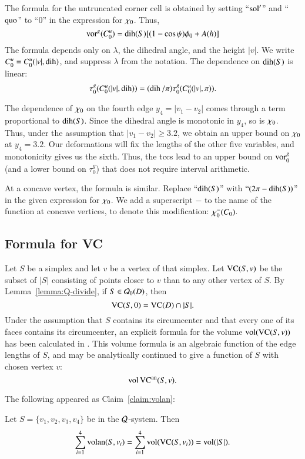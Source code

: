 The formula for the untruncated corner cell is obtained by setting
``$\operatorname{sol}'$'' and ``$\operatorname{quo}$'' to ``$0$'' in the expression for
$\chi_0$. Thus,
    $$
    \operatorname{vor}^g(C_0^u) = \operatorname{dih}(S)[(1-\cos\psi)\phi_0 + A(h)]
    $$
The formula depends only on $\lambda$, the dihedral angle, and the
height $|v|$.  We write $C_0^u = C_0^u(|v|,\operatorname{dih})$, and suppress
$\lambda$ from the notation. The dependence on $\operatorname{dih}(S)$ is
linear:
    $$
    \tau^g_0(C_0^u(|v|,\operatorname{dih}))= (\operatorname{dih}/\pi)\tau^g_0(C_0^u(|v|,\pi)).
    $$

The dependence of $\chi_0$ on the fourth edge $y_4=|v_1-v_2|$
comes through a term proportional to $\operatorname{dih}(S)$.  Since the
dihedral angle is monotonic in $y_4$, so is $\chi_0$.  Thus, under
the assumption that $|v_1-v_2|\ge3.2$,  we obtain an upper bound
on $\chi_0$ at $y_4=3.2$. Our deformations will fix the lengths of
the other five variables, and monotonicity gives us the sixth.
Thus, the tccs lead to an upper bound on $\operatorname{vor}^g_0$ (and a lower
bound on $\tau^g_0$) that does not require interval arithmetic.


At a concave vertex, the formula is similar.  Replace
``$\operatorname{dih}(S)$'' with $``(2\pi-\operatorname{dih}(S))$'' in the given expression
for $\chi_0$. We add a superscript $-$ to the name of the function
at concave vertices, to denote this modification: $\chi_0^-(C_0)$.


\subsection{Formula for VC}


Let $S$ be a simplex and let $v$ be a vertex of that simplex. Let
${\operatorname{VC}}(S,v)$ be the subset of $|S|$ consisting of points closer
to $v$ than to any other vertex of $S$. By
Lemma~\ref{lemma:Q-divide}, if $S\in{\mathcal Q}_0(D)$, then
$${\operatorname{VC}}(S,0) = {\operatorname{VC}}(D)\cap |S|.$$
Under the assumption that $S$ contains its circumcenter and that
every one of its faces contains its circumcenter, an explicit
formula for the volume ${\operatorname{vol}}({\operatorname{VC}}(S,v))$ has been
calculated in \cite[Section~8.6.3]{part1}. This volume formula is
an algebraic function of the edge lengths of $S$, and may be
analytically continued to give a function of $S$ with chosen
vertex $v$:
  $${\operatorname{vol}}\,{\operatorname{VC}}^{\operatorname{an}}(S,v).$$



The following appeared as Claim~\ref{claim:volan}:
\begin{lemma}\label{lemma:volan}  %
Let $S=\{v_1,v_2,v_3,v_4\}$ be in the ${\mathcal Q}$-system. Then
    $$
    \sum_{i=1}^4 {\operatorname{volan}}(S,v_i) = \sum_{i=1}^4
    {\operatorname{vol}}({\operatorname{VC}}(S,v_i)) = {\operatorname{vol}}(|S|).
    $$
\end{lemma}




